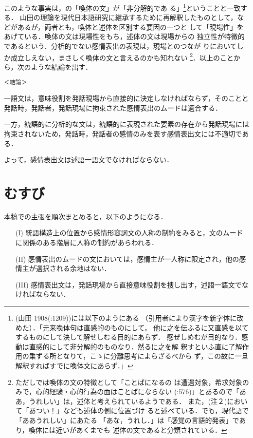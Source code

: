 このような事実は，\cite{山田1908,山田1936}の「喚体の文」が「非分解的であ
る」\cite{山田1908}\footnote{(山田 1908(:1209))には以下のようにある
（引用者により漢字を新字体に改めた）．「元来喚体句は直感的のものにして，
他に之を伝ふるに又直感を以てするものにして決して解せしむる目的にあらず．
感ぜしめむが目的なり．感動は直感的にして非分解的のものなり．然るに之を解
釈すといふ直に了解作用の乗ずる所となりて，こゝに分離思考によらざるべから
ず，この故に一旦解釈すればすでに喚体文にあらず．」}ということと一致する．
山田の理論を現代日本語研究に継承するために再解釈したものとして，\cite{尾
上1986,堀川1996}などがあるが，両者とも，喚体と述体を区別する要因の一つと
して「現場性」をあげている．喚体の文は現場性をもち，述体の文は現場からの
独立性が特徴的であるという．分析的でない感情表出の表現は，現場とのつなが
りにおいてしか成立しえない，まさしく喚体の文と言えるのかも知れない
\footnote{ただし\cite{尾上1986}では喚体の文の特徴として「ことばになるの
は遭遇対象，希求対象のみで，心的経験・心的行為の面はことばにならない
(:576)」とあるので「ああ，うれしい」は，述体と考えられているようである．
また，\cite{尾上1998}(注２)において「あつい！」なども述体の側に位置づけ
ると述べている．\cite{山田1908}でも，現代語で「ああうれしい」にあたる
「あな，うれし．」は「感覚の言語的発表」であり，喚体には近いがあくまでも
述体の文であると分類されている．}．以上のことから，次のような結論を出す．

\begin{verbatim}
＜結論＞
\end{verbatim}

一語文は，意味役割を発話現場から直接的に決定しなければならず，そのことと
発話時，発話者，発話現場に拘束された感情表出のムードは適合する．

一方，統語的に分析的な文は，統語的に表現された要素の存在から発話現場には
拘束されないため，発話時，発話者の感情のみを表す感情表出文には不適切であ
る．

よって，感情表出文は述語一語文でなければならない．


\section{むすび}

本稿での主張を順次まとめると，以下のようになる．

\begin{itemize}
 \item[(I)] 統語構造上の位置から感情形容詞文の人称の制約をみると，文のムード
       に関係のある階層に人称の制約があらわれる．
 \item[(II)] 感情表出のムードの文においては，感情主が一人称に限定され，他の感
       情主が選択される余地はない．
 \item[(III)] 感情表出文は，発話現場から直接意味役割を捜し出す，述語一語文でな
       ければならない．
\end{itemize}

